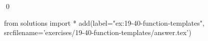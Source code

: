 
\begin{ex}
  \label{ex:19-40-function-templates}
  
  \qed
\end{ex}
\begin{python0}
from solutions import *
add(label="ex:19-40-function-templates",
    srcfilename='exercises/19-40-function-templates/answer.tex')
\end{python0}

